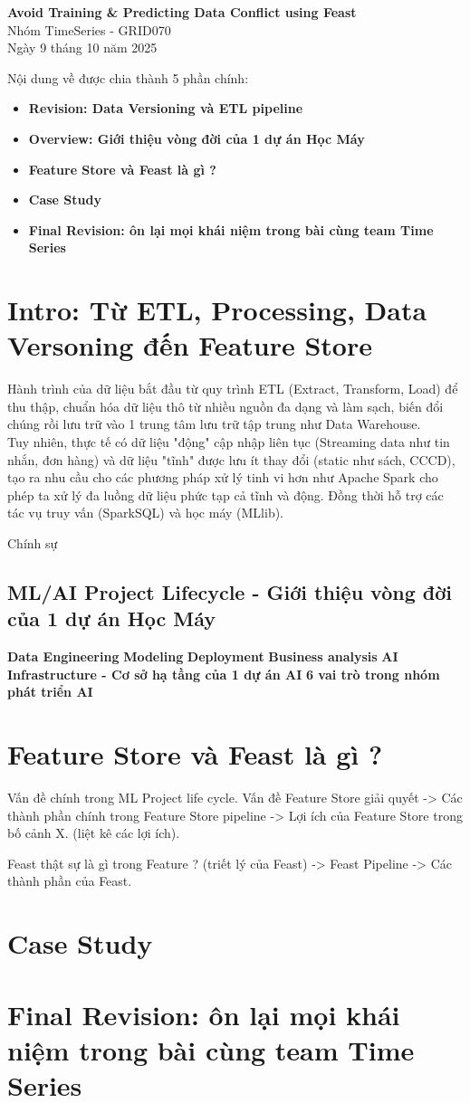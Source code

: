 \documentclass[11pt]{article}
\renewcommand{\maketitle}{
    \begin{center}
        \fontsize{18}{20}\selectfont\textbf{Avoid Training \& Predicting Data Conflict using Feast}\\[1em]
        \fontsize{14}{16}\selectfont Nhóm TimeSeries - GRID070\\[0.5em]
        \fontsize{14}{16}\selectfont Ngày 9 tháng 10 năm 2025
    \end{center}
    \vspace{1.5em}
}
\begin{document}
\maketitle

\begin{summarybox}
Nội dung về được chia thành 5 phần chính:
    \begin{itemize}
	\item \textbf{Revision: Data Versioning và ETL pipeline}
	\item \textbf{Overview: Giới thiệu vòng đời của 1 dự án Học Máy}
	\item \textbf{Feature Store và Feast là gì ?}
	\item \textbf{Case Study}
	\item \textbf{Final Revision: ôn lại mọi khái niệm trong bài cùng team Time Series}
    \end{itemize}
\end{summarybox}

\section{Intro: Từ ETL, Processing, Data Versoning đến Feature Store}
Hành trình của dữ liệu bắt đầu từ quy trình ETL (Extract, Transform, Load) để thu thập, chuẩn hóa dữ liệu thô từ nhiều nguồn đa dạng và làm sạch, biến đổi chúng rồi lưu trữ vào 1 trung tâm lưu trữ tập trung như Data Warehouse. \\

Tuy nhiên, thực tế có dữ liệu "động" cập nhập liên tục (Streaming data như tin nhắn, đơn hàng) và dữ liệu "tĩnh" được lưu ít thay đổi (static như sách, CCCD), tạo ra nhu cầu cho các phương pháp xử lý tinh vi hơn như Apache Spark cho phép ta xử lý đa luồng dữ liệu phức tạp cả tĩnh và động. Đồng thời hỗ trợ các tác vụ truy vấn (SparkSQL) và học máy (MLlib).

Chính sự


\subsection{ML/AI Project Lifecycle - Giới thiệu vòng đời của 1 dự án Học Máy}
\textbf{Data Engineering}
\textbf{Modeling}
\textbf{Deployment}
\textbf{Business analysis}
\textbf{AI Infrastructure - Cơ sở hạ tầng của 1 dự án AI}
\textbf{6 vai trò trong nhóm phát triển AI}

\section{Feature Store và Feast là gì ?}
Vấn đề chính trong ML Project life cycle.
Vấn đề Feature Store giải quyết
-> Các thành phần chính trong Feature Store pipeline
-> Lợi ích của Feature Store trong bố cảnh X. (liệt kê các lợi ích).

Feast thật sự là gì trong Feature ? (triết lý của Feast)
-> Feast Pipeline -> Các thành phần của Feast.

\section{Case Study}



\section{Final Revision: ôn lại mọi khái niệm trong bài cùng team Time Series}


\end{document}
